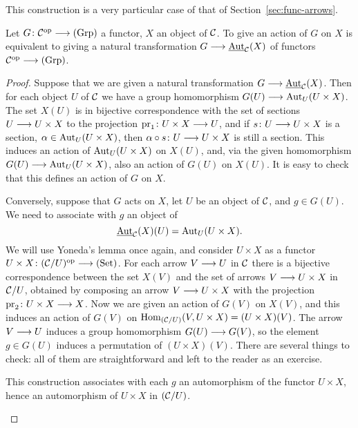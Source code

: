 \begin{2   CONTRAVARIANT FUNCTORS}
\begin{2.2 Group objects}
This construction is a very particular case of that of Section~\ref{sec:func-arrows}.

\begin{proposition}\label{prop:action-homo}
Let $G \colon \cC\op \arr \catgrp$ a functor, $X$ an object of $\mathcal{C}$. To give an action of $G$ on $X$ is equivalent to giving a natural transformation $G \arr \underaut_{\cC}(X)$ of functors $\cC\op \arr \catgrp$.
\end{proposition}

\begin{proof}
Suppose that we are given a natural transformation $G \arr \underaut_{\cC}(X)$. Then for each object $U$ of $\mathcal{C}$ we have a group homomorphism $G(U) \arr \aut_U(U \times X)$. The set $X(U)$ is in bijective correspondence with the set of sections $U \arr U \times X$ to the projection $\pr_1 \colon U \times X \arr U$, and if $s \colon U \arr U \times X$ is a section, $\alpha \in \operatorname{Aut}_U(U \times X)$, then $\alpha \circ s \colon U \arr U \times X$ is still a section. This induces an action of $\operatorname{Aut}_U(U \times X)$ on $X(U)$, and, via the given homomorphism $G(U) \arr \aut_U(U \times X)$, also an action of $G(U)$ on $X(U)$. It is easy to check that this defines an action of $G$ on $X$.

Conversely, suppose that $G$ acts on $X$, let $U$ be an object of $\mathcal{C}$, and $g \in G(U)$. We need to associate with $g$ an object of 
   \[
   \mathop{\underline{\mathrm{Aut}}}\nolimits_{\mathcal{C}}(X)(U) = \operatorname{Aut}_{U}(U \times X).
   \]
We will use Yoneda's lemma once again, and consider $U \times X$ as a functor $U \times X \colon (\cC/U)\op \arr \catset$. For each arrow $V \arr U$ in $\mathcal{C}$ there is a bijective correspondence between the set $X(V)$ and the set of arrows $V \arr U \times X$ in $\mathcal{C}/U$, obtained by composing an arrow $V \arr U \times X$ with the projection $\pr_{2}\colon U \times X \arr X$. Now we are given an action of $G(V)$ on $X(V)$, and this induces an action of $G(V)$ on $\operatorname{Hom}_{(\mathcal{C}/U)}(V, U \times X) = (U \times X)(V)$. The arrow $V \arr U$ induces a group homomorphism $G(U) \arr G(V)$, so the element $g \in G(U)$ induces a permutation of $(U \times X)(V)$. There are several things to check: all of them are straightforward and left to the reader as an exercise.

\begin{enumeratei}

\item This construction associates with each $g$ an automorphism of the functor $U \times X$, hence an automorphism of $U \times X$ in $(\mathcal{C}/U)$.


\end{enumeratei}
\end{proof}
\end{2.2 Group objects}
\end{2   CONTRAVARIANT FUNCTORS}
